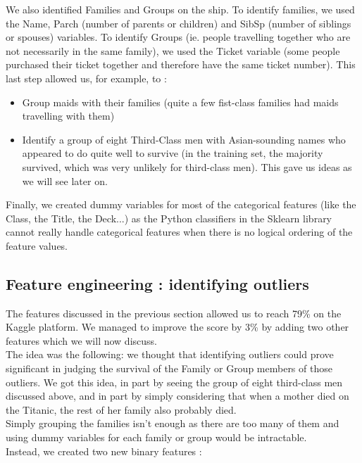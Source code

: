 \documentclass[a4paper,10pt]{article}
\begin{document}
We also identified Families and Groups on the ship. To identify families, we used the Name, Parch (number of parents or children) and SibSp (number of siblings or spouses) variables. To identify Groups (ie. people travelling together who are not necessarily in the same family), we used the Ticket variable (some people purchased their ticket together and therefore have the same ticket number). This last step allowed us, for example, to :

\begin{itemize}
\item Group maids with their families (quite a few fist-class families had maids travelling with them)
\item Identify a group of eight Third-Class men with Asian-sounding names who appeared to do quite well to survive (in the training set, the majority survived, which was very unlikely for third-class men). This gave us ideas as we will see later on.
\end{itemize}

Finally, we created dummy variables for most of the categorical features (like the Class, the Title, the Deck...) as the Python classifiers in the Sklearn library cannot really handle categorical features when there is no logical ordering of the feature values.

\subsection{Feature engineering : identifying outliers}

The features discussed in the previous section allowed us to reach 79\% on the Kaggle platform. We managed to improve the score by 3\% by adding two other features which we will now discuss. \\

The idea was the following: we thought that identifying outliers could prove significant in judging the survival of the Family or Group members of those outliers. We got this idea, in part by seeing the group of eight third-class men discussed above, and in part by simply considering that when a mother died on the Titanic, the rest of her family also probably died. \\

Simply grouping the families isn't enough as there are too many of them and using dummy variables for each family or group would be intractable. \\

Instead, we created two new binary features :
\end{document}
